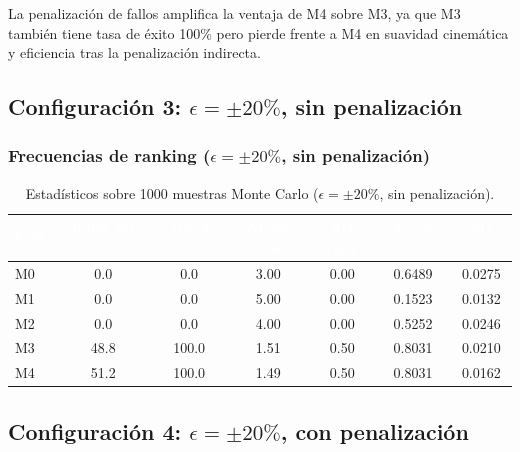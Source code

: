 \documentclass[12pt,a4paper,oneside]{book}
\begin{document}
La penalización de fallos amplifica la ventaja de M4 sobre M3, ya que M3 también tiene tasa de éxito 100\% pero pierde frente a M4 en suavidad cinemática y eficiencia tras la penalización indirecta.

\subsection{Configuración 3: $\epsilon = \pm 20\%$, sin penalización}

\subsubsection*{Frecuencias de ranking ($\epsilon = \pm 20\%$, sin penalización)}
\begin{table}[H]
\centering
\caption{Estadísticos sobre 1000 muestras Monte Carlo ($\epsilon = \pm 20\%$, sin penalización).}
\renewcommand{\arraystretch}{1.3}
\begin{tabular}{lcccccc}
\toprule
\rowcolor{primary}
\textcolor{white}{\textbf{Mét.}} & \textcolor{white}{\textbf{Rank \#1 (\%)}} & \textcolor{white}{\textbf{Top-2 (\%)}} & \textcolor{white}{\textbf{Mean rank}} & \textcolor{white}{\textbf{SD rank}} & \textcolor{white}{\textbf{Mean CC}} & \textcolor{white}{\textbf{SD CC}} \\
\midrule
M0 & 0.0 & 0.0 & 3.00 & 0.00 & 0.6489 & 0.0275 \\
M1 & 0.0 & 0.0 & 5.00 & 0.00 & 0.1523 & 0.0132 \\
M2 & 0.0 & 0.0 & 4.00 & 0.00 & 0.5252 & 0.0246 \\
M3 & 48.8 & 100.0 & 1.51 & 0.50 & 0.8031 & 0.0210 \\
M4 & 51.2 & 100.0 & 1.49 & 0.50 & 0.8031 & 0.0162 \\
\bottomrule
\end{tabular}
\end{table}

\subsection{Configuración 4: $\epsilon = \pm 20\%$, con penalización}
\end{document}
